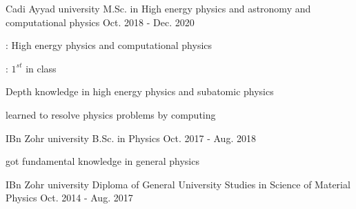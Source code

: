 

\begin{cventries}

  \cventry
    {Cadi Ayyad university} %
        {M.Sc. in High energy physics and astronomy and computational physics } %
    {} %
    {Oct. 2018 - Dec. 2020} %
    {
      \begin{cvitems} %
        \item {:  High energy physics and computational physics}
        \item {: $1^{st}$ in class}
        \item {Depth knowledge in high energy physics and subatomic physics}
        \item {learned  to resolve physics problems by computing }
      \end{cvitems}
    }

      \cventry
    {IBn Zohr university} %
        {B.Sc. in Physics} %
    {} %
    {Oct. 2017 - Aug. 2018} %
    {
      \begin{cvitems} %
        \item {got fundamental knowledge in general  physics}
      \end{cvitems}
    }

          \cventry
    {IBn Zohr university} %
        {Diploma of General University Studies in Science of Material Physics} %
    {} %
    {Oct. 2014 - Aug. 2017} %
    {
    }
    

\end{cventries}
